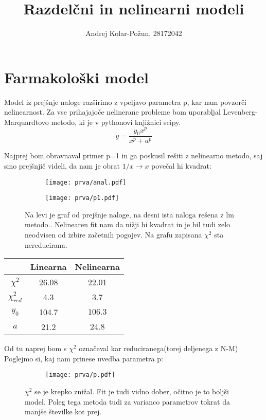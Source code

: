 \documentclass{article}
\title{Razdelčni in nelinearni modeli}
\author{Andrej Kolar-Požun, 28172042}
\begin{document}
\maketitle
\newpage
{}
\section{Farmakološki model}
Model iz prejšnje naloge razširimo z vpeljavo parametra p, kar nam povzorči nelinearnost. Za vse prihajajoče nelinerane probleme bom uporabljal Levenberg-Marquardtovo metodo, ki je v pythonovi knjižnici scipy.
\begin{equation*}
y = \frac{y_0 x^p}{x^p + a^p}
\end{equation*}

Najprej bom obravnaval primer p=1 in ga poskusil rešiti z nelinearno metodo, saj smo prejšnjič videli, da nam je obrat $1/x \rightarrow x$ povečal hi kvadrat:

\begin{figure}[H]
\begin{subfigure}{.49\textwidth}
\texttt{[image: prva/anal.pdf]}
\end{subfigure}
\begin{subfigure}{.49\textwidth}
\texttt{[image: prva/p1.pdf]}
\end{subfigure}
\caption*{Na levi je graf od prejšnje naloge, na desni ista naloga rešena z lm metodo.. Nelinearen fit nam da nižji hi kvadrat in je bil tudi zelo neodvisen od izbire začetnih pogojev. Na grafu zapisana $\chi^2$ sta nereducirana.}
\end{figure}
\begin{center}
\begin{tabular}{|c|c|c|}
\hline
& Linearna & Nelinearna \\ \hline
$\chi^2$ & 26.08 & 22.01 \\ \hline
$\chi^2_{red}$ & 4.3 & 3.7 \\ \hline
$y_0$ & 104.7&$ 106.3$ \\ \hline
$a$ & 21.2 &$24.8$ \\ \hline
\end{tabular}
\end{center}

Od tu naprej bom s $\chi^2$ označeval kar reduciranega(torej deljenega z N-M)
Poglejmo si, kaj nam prinese uvedba parametra p:

\begin{figure}[H]
\begin{subfigure}{\textwidth}
\texttt{[image: prva/p.pdf]}
\end{subfigure}
\caption*{$\chi^2$ se je krepko znižal. Fit je tudi vidno dober, očitno je to boljši model. Poleg tega metoda tudi za varianco parametrov tokrat da manjše številke kot prej.}
\end{figure}
\end{document}
